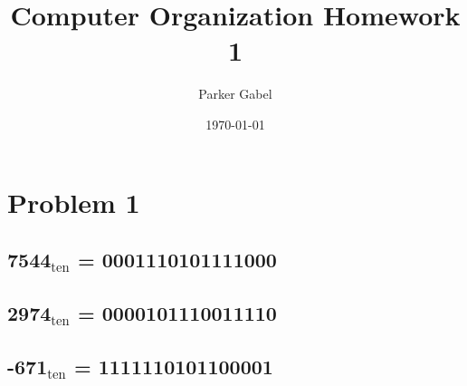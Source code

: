 \documentclass[11pt]{article}
\author{Parker Gabel}
\date{\today}
\title{Computer Organization Homework 1}
\begin{document}
\maketitle

\section{Problem 1}
\label{sec:org4af7b1d}
\subsection{7544\(_{\text{ten}}\) = 0001110101111000}
\label{sec:org56b7011}
\subsection{2974\(_{\text{ten}}\) = 0000101110011110}
\label{sec:org0ced73d}
\subsection{-671\(_{\text{ten}}\) = 1111110101100001}
\label{sec:org03d92d9}
\end{document}
